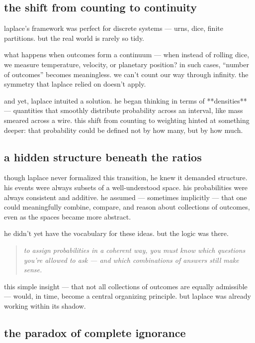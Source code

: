 \subsection{the shift from counting to continuity}

laplace’s framework was perfect for discrete systems — urns, dice, finite partitions. but the real world is rarely so tidy.

what happens when outcomes form a continuum — when instead of rolling dice, we measure temperature, velocity, or planetary position? in such cases, “number of outcomes” becomes meaningless. we can’t count our way through infinity. the symmetry that laplace relied on doesn’t apply.

and yet, laplace intuited a solution. he began thinking in terms of **densities** — quantities that smoothly distribute probability across an interval, like mass smeared across a wire. this shift from counting to weighting hinted at something deeper: that probability could be defined not by how many, but by how much.

\subsection{a hidden structure beneath the ratios}

though laplace never formalized this transition, he knew it demanded structure. his events were always subsets of a well-understood space. his probabilities were always consistent and additive. he assumed — sometimes implicitly — that one could meaningfully combine, compare, and reason about collections of outcomes, even as the spaces became more abstract.

he didn’t yet have the vocabulary for these ideas. but the logic was there.

\begin{quote}
    \textit{to assign probabilities in a coherent way, you must know which questions you’re allowed to ask — and which combinations of answers still make sense.}
\end{quote}

this simple insight — that not all collections of outcomes are equally admissible — would, in time, become a central organizing principle. but laplace was already working within its shadow.

\subsection{the paradox of complete ignorance}

